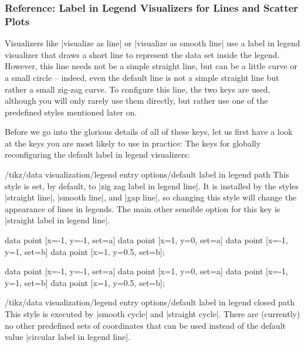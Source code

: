 \subsubsection{Reference: Label in Legend Visualizers for Lines and Scatter Plots}

Visualizers like |visualize as line| or |visualize as smooth line| use a label
in legend visualizer that draws a short line to represent the data set inside
the legend. However, this line needs not be a simple straight line, but can be
a little curve or a small circle -- indeed, even the default line is not a
simple straight line but rather a small zig-zag curve. To configure this line,
the two keys are used, although you will only rarely use them directly, but
rather use one of the predefined styles mentioned later on.

Before we go into the glorious details of all of these keys, let us first have
a look at the keys you are most likely to use in practice: The keys for
globally reconfiguring the default label in legend visualizers:
%
\begin{stylekey}{/tikz/data visualization/legend entry options/default label in legend path}
    This style is set, by default, to |zig zag label in legend line|. It is
    installed by the styles |straight line|, |smooth line|, and |gap line|, so
    changing this style will change the appearance of lines in legends. The
    main other sensible option for this key is |straight label in legend line|.
\begin{codeexample}[width=5cm,preamble={\usetikzlibrary{datavisualization}}]
\tikz \datavisualization [
  school book axes, visualize as line/.list={a,b},
  style sheet=vary dashing,
  a={label in legend={text=a}},  b={label in legend={text=b}}]
data point [x=-1, y=-1, set=a]   data point [x=1, y=0, set=a]
data point [x=-1, y=1,  set=b]   data point [x=1, y=0.5, set=b];
\end{codeexample}
\begin{codeexample}[width=5cm,preamble={\usetikzlibrary{datavisualization}}]
\tikz \datavisualization [
  school book axes, visualize as line/.list={a,b},
  legend entry options/default label in legend path/.style=
    straight label in legend line,
  style sheet=vary dashing,
  a={label in legend={text=a}},  b={label in legend={text=b}}]
data point [x=-1, y=-1, set=a]   data point [x=1, y=0, set=a]
data point [x=-1, y=1,  set=b]   data point [x=1, y=0.5, set=b];
\end{codeexample}
\end{stylekey}
%
\begin{stylekey}{/tikz/data visualization/legend entry options/default label in legend closed path}
    This style is executed by |smooth cycle| and |straight cycle|. There are
    (currently) no other predefined sets of coordinates that can be used
    instead of the default value |circular label in legend line|.
\end{stylekey}

